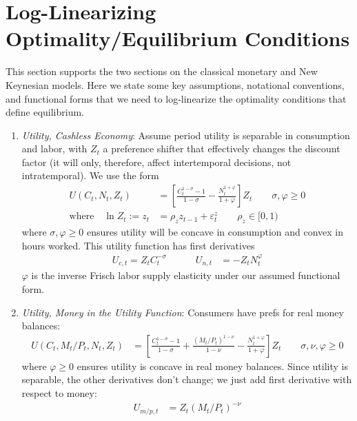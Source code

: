 \documentclass[12pt]{article}
\theoremstyle{plain}
\theoremstyle{definition}
\theoremstyle{remark}
\begin{document}

\appendix
\clearpage
\section{Log-Linearizing Optimality/Equilibrium Conditions}

This section supports the two sections on the classical monetary and New
Keynesian models.
Here we state some key assumptions, notational conventions, and
functional forms that we need to log-linearize the optimality conditions
that define equilibrium.
\begin{enumerate}
  \item \emph{Utility, Cashless Economy}:
    Assume period utility is separable in consumption and labor, with
    $Z_t$ a preference shifter that effectively changes the discount
    factor (it will only, therefore, affect intertemporal decisions, not
    intratemporal). We use the form
    \begin{align*}
      U(C_t,N_t,Z_t) &=
      \left[
        \frac{C_t^{1-\sigma}-1}{1-\sigma}
        -
        \frac{N_t^{1+\varphi}}{1+\varphi}
      \right] Z_t
      \qquad \sigma,\varphi \geq 0 \\
      \text{where}\quad
      \ln Z_t :=
      z_t &= \rho_z z_{t-1} + \varepsilon_t^z
      \qquad \rho_z\in[0,1)
    \end{align*}
    where $\sigma,\varphi\geq 0$ ensures utility will be concave in
    consumption and convex in hours worked.
    This utility function has first derivatives
    \begin{align*}
      U_{c,t} = Z_t C_t^{-\sigma}
      \qquad\quad
      U_{n,t} &= -Z_t N_t^{\varphi}
    \end{align*}
    $\varphi$ is the inverse Frisch labor supply elasticity under our
    assumed functional form.

  \item \emph{Utility, Money in the Utility Function}:
    Consumers have prefs for real money balances:
    \begin{align*}
      U(C_t,M_t/P_t,N_t,Z_t) &=
      \left[
        \frac{C_t^{1-\sigma}-1}{1-\sigma}
        + \frac{(M_t/P_t)^{1-\nu}}{1-\nu}
        - \frac{N_t^{1+\varphi}}{1+\varphi}
      \right] Z_t
      \qquad \sigma,\nu,\varphi \geq 0
    \end{align*}
    where $\varphi\geq 0$ ensures utility is concave in real money
    balances.
    Since utility is separable, the other derivatives don't change; we
    just add first derivative with respect to money:
    \begin{align*}
      U_{m/p,t} &= Z_t (M_t/P_t)^{-\nu}
    \end{align*}


\end{enumerate}
\end{document}
